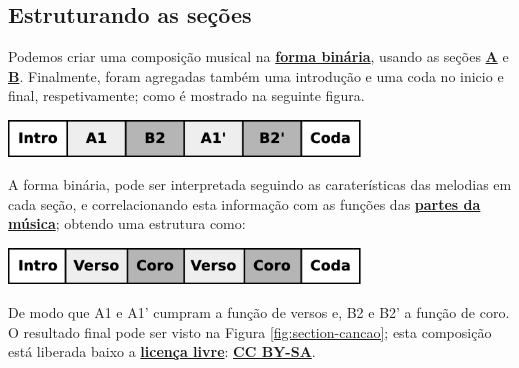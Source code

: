 \subsection{Estruturando as seções}

\begin{example}
Podemos criar uma composição musical na \hyperref[subsec:formabinaria]{\textbf{forma binária}}, usando as seções 
\hyperref[subsec:criandoa]{\textbf{A}} e 
\hyperref[subsec:criandob]{\textbf{B}}.
Finalmente, foram agregadas também uma introdução e uma coda no inicio e final, respetivamente; 
como é mostrado na seguinte figura.
\begin{center}
	     \includegraphics[width=0.70\textwidth]{chapters/cap-musica-topicos/section-cancao-block.eps}
\end{center}
A forma binária, pode ser interpretada seguindo as caraterísticas das melodias em cada seção, 
e correlacionando esta informação com as funções das 
\hyperref[subsec:partesmusica]{\textbf{partes da música}};
obtendo uma estrutura como:
\begin{center}
	     \includegraphics[width=0.70\textwidth]{chapters/cap-musica-topicos/section-cancao-block2.eps}
\end{center}
De modo que  A1 e A1' cumpram a função de versos  e, B2 e B2' a função de  coro.  \\
O resultado final pode ser visto na Figura \ref{fig:section-cancao};
esta composição está liberada baixo a 
\hyperref[ref:licensalivre]{\textbf{licença livre}}: 
\hyperref[subsec:CCBYSA]{\textbf{CC BY-SA}}.
\end{example}



